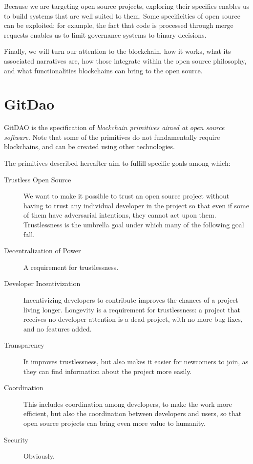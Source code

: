 \documentclass[english]{yMasterThesis}
\begin{document}
Because we are targeting open source projects, exploring their specifics enables us to build systems that are well suited to them.
Some specificities of open source can be exploited; for example, the fact that code is processed through merge requests enables us to limit governance systems to binary decisions.

Finally, we will turn our attention to the blockchain, how it works, what its associated narratives are, how those integrate within the open source philosophy, and what functionalities blockchains can bring to the open source.





\part{GitDao}

\partSecondPage%
GitDAO%
is the specification of \emph{blockchain primitives aimed at open source software}.
Note that some of the primitives do not fundamentally require blockchains, and can be created using other technologies.

The primitives described hereafter aim to fulfill specific goals among which:

\begin{description}
  \item[Trustless Open Source]
    We want to make it possible to trust an open source project without having to trust any individual developer in the project so that even if some of them have adversarial intentions, they cannot act upon them.
    Trustlessness is the umbrella goal under which many of the following goal fall.
  \item[Decentralization of Power]
    A requirement for trustlessness.
  \item[Developer Incentivization]
    Incentivizing developers to contribute improves the chances of a project living longer.
    Longevity is a requirement for trustlessness: a project that receives no developer attention is a dead project, with no more bug fixes, and no features added.
  \item[Transparency]
    It improves trustlessness, but also makes it easier for newcomers to join, as they can find information about the project more easily.
  \item[Coordination]
    This includes coordination among developers, to make the work more efficient, but also the coordination between developers and users, so that open source projects can bring even more value to humanity.
  \item[Security]
    Obviously.
\end{description}
\end{document}
